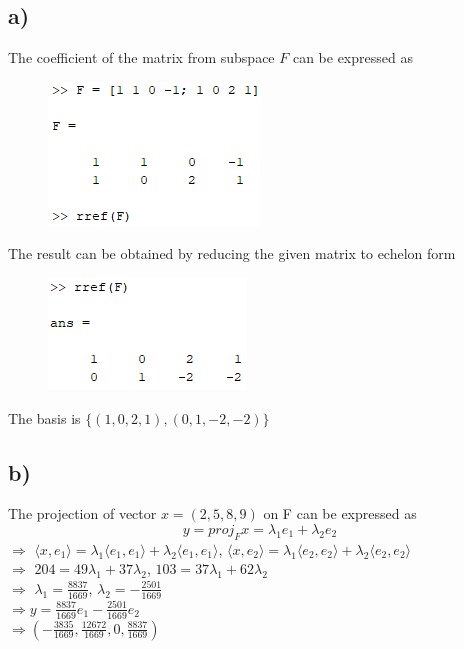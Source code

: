 \documentclass[12pt,en,a4paper]{article}
\begin{document}
	\subsection*{a)}
	The coefficient of the matrix from subspace $F$ can be expressed as
	\begin{figure}[H]
		\centering
		\includegraphics[scale=0.8]{prob5a1.png}
		\label{prob5c1}
	\end{figure}
	The result can be obtained by reducing the given matrix to echelon form
	\begin{figure}[H]
		\centering
		\includegraphics[scale=0.8]{prob5a2.png}
		\label{prob5a2}
	\end{figure}
	The basis is $\{(1,0,2,1),(0,1,-2,-2)\}$
	\subsection*{b)}
	The projection of vector $x=(2, 5, 8, 9)$ on F can be expressed as
	\begin{equation*}
	y=proj_{F}x = \lambda_1 e_1 + \lambda_2 e_2
	\end{equation*}
	$\Rightarrow$ \(\langle x, e_1 \rangle = \lambda_1 \langle e_1, e_1\rangle + \lambda_2 \langle e_1, e_1 \rangle\), \(\langle x, e_2 \rangle = \lambda_1 \langle e_2, e_2\rangle + \lambda_2 \langle e_2, e_2 \rangle\)\\
	$\Rightarrow$ \(204 = 49 \lambda_1 + 37 \lambda_2\), \(103 = 37 \lambda_1 + 62 \lambda_2\)\\
	$\Rightarrow$ \(\lambda_1 = \frac{8837}{1669}\), $\lambda_2 = -\frac{2501}{1669}$\\
	$\Rightarrow y=\frac{8837}{1669} e_1 - \frac{2501}{1669} e_2$\\
	
	$\Rightarrow (-\frac{3835}{1669}, \frac{12672}{1669}, 0, \frac{8837}{1669})$	
	
\end{document}
